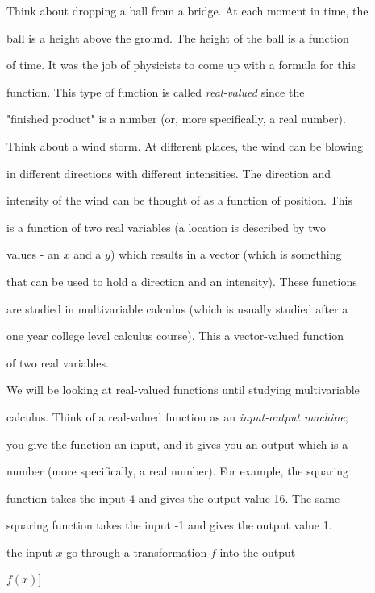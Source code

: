 Think about dropping a ball from a bridge. At each moment in time, the

ball is a height above the ground. The height of the ball is a function

of time. It was the job of physicists to come up with a formula for this

function. This type of function is called \textit{real-valued} since the

"finished product" is a number (or, more specifically, a real number).



Think about a wind storm. At different places, the wind can be blowing

in different directions with different intensities. The direction and

intensity of the wind can be thought of as a function of position. This

is a function of two real variables (a location is described by two

values - an $x$ and a $y$) which results in a vector (which is something

that can be used to hold a direction and an intensity). These functions

are studied in multivariable calculus (which is usually studied after a

one year college level calculus course). This a vector-valued function

of two real variables.



We will be looking at real-valued functions until studying multivariable

calculus. Think of a real-valued function as an \textit{input-output machine};

you give the function an input, and it gives you an output which is a

number (more specifically, a real number). For example, the squaring

function takes the input 4 and gives the output value 16. The same

squaring function takes the input -1 and gives the output value 1.




the input $x$ go through a transformation $f$ into the output

$f(x)$]



